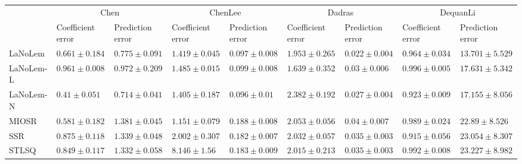 \begin{table*}
{\begin{tabular}{lllllllll}
 & \multicolumn{2}{c}{Chen} & \multicolumn{2}{c}{ChenLee} & \multicolumn{2}{c}{Dadras} & \multicolumn{2}{c}{DequanLi} \\
 & Coefficient error & Prediction error & Coefficient error & Prediction error & Coefficient error & Prediction error & Coefficient error & Prediction error \\
\midrule
LaNoLem & $0.661\pm 0.184$ & $0.775\pm 0.091$ & $1.419\pm 0.045$ & $0.097\pm 0.008$ & $1.953\pm 0.265$ & $\mathbf{0.022}\pm 0.004$ & $0.964\pm 0.034$ & $\mathbf{13.701}\pm 5.529$ \\
LaNoLem-L & $0.961\pm 0.008$ & $0.972\pm 0.209$ & $1.485\pm 0.015$ & $0.099\pm 0.008$ & $\mathbf{1.639}\pm 0.352$ & $0.03\pm 0.006$ & $0.996\pm 0.005$ & $17.631\pm 5.342$ \\
LaNoLem-N & $\mathbf{0.41}\pm 0.051$ & $\mathbf{0.714}\pm 0.041$ & $1.405\pm 0.187$ & $\mathbf{0.096}\pm 0.01$ & $2.382\pm 0.192$ & $0.027\pm 0.004$ & $0.923\pm 0.009$ & $17.155\pm 8.056$ \\
MIOSR & $0.581\pm 0.182$ & $1.381\pm 0.045$ & $\mathbf{1.151}\pm 0.079$ & $0.188\pm 0.008$ & $2.053\pm 0.056$ & $0.04\pm 0.007$ & $0.989\pm 0.024$ & $22.89\pm 8.526$ \\
SSR & $0.875\pm 0.118$ & $1.339\pm 0.048$ & $2.002\pm 0.307$ & $0.182\pm 0.007$ & $2.032\pm 0.057$ & $0.035\pm 0.003$ & $\mathbf{0.915}\pm 0.056$ & $23.054\pm 8.307$ \\
STLSQ & $0.849\pm 0.117$ & $1.332\pm 0.058$ & $8.146\pm 1.56$ & $0.183\pm 0.009$ & $2.015\pm 0.213$ & $0.035\pm 0.003$ & $0.992\pm 0.008$ & $23.227\pm 8.982$ \\

\midrule


\end{tabular}}
\end{table*}
